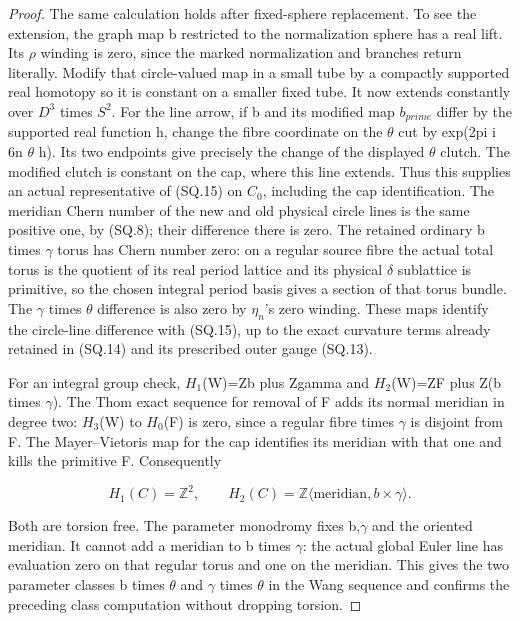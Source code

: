\begin{proof}
The same calculation holds after fixed-sphere replacement. To see the
extension, the graph map b restricted to the normalization sphere has
a real lift. Its \(\rho\) winding is zero, since the marked normalization
and branches return literally. Modify that circle-valued map in a
small tube by a compactly supported real homotopy so it is constant
on a smaller fixed tube. It now extends constantly over \(D^{3}\) times \(S^{2}\).
For the line arrow, if b and its modified map \(b_{prime}\) differ by the
supported real function h, change the fibre coordinate on the \(\theta\)
cut by exp(2pi i 6n \(\theta\) h). Its two endpoints give precisely the
change of the displayed \(\theta\) clutch. The modified clutch is constant
on the cap, where this line extends. Thus this supplies an actual
representative of (SQ.15) on \(C_{0}\), including the cap identification. The
meridian Chern number of the new and old physical circle lines is
the same positive one, by (SQ.8); their difference there is zero.
The retained ordinary b times \(\gamma\) torus has Chern number zero:
on a regular source fibre the actual total torus is the quotient of
its real period lattice and its physical \(\delta\) sublattice is primitive,
so the chosen integral period basis gives a section of that torus
bundle. The \(\gamma\) times \(\theta\) difference is also zero by \(\eta_{n}\)'s
zero winding. These maps identify the circle-line difference with
(SQ.15), up to the exact curvature terms already retained in (SQ.14)
and its prescribed outer gauge (SQ.13).

For an integral group check, \(H_{1}\)(W)=Zb plus Zgamma and
\(H_{2}\)(W)=ZF plus Z(b times \(\gamma\)). The Thom exact sequence for removal
of F adds its normal meridian in degree two: \(H_{3}\)(W) to \(H_{0}\)(F) is
zero, since a regular fibre times \(\gamma\) is disjoint from F. The
Mayer--Vietoris map for the cap identifies its meridian with that
one and kills the primitive F. Consequently

\[
 H_1(C)=\mathbb Z^2,\qquad
 H_2(C)=\mathbb Z\langle\text{meridian},b\times\gamma\rangle.
                                                        \tag{SQ.16}
\]

Both are torsion free. The parameter monodromy fixes b,\(\gamma\) and
the oriented meridian. It cannot add a meridian to b times \(\gamma\):
the actual global Euler line has evaluation zero on that regular
torus and one on the meridian. This gives the two parameter classes
b times \(\theta\) and \(\gamma\) times \(\theta\) in the Wang sequence and
confirms the preceding class computation without dropping torsion.


\end{proof}

